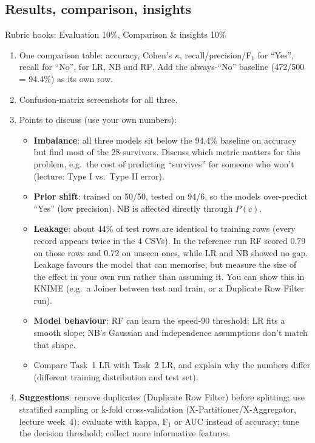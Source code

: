 \documentclass[11pt,a4paper]{article}
\begin{document}
\subsection{Results, comparison, insights}
\begin{rubric}{Rubric hooks: Evaluation 10\%, Comparison \& insights 10\%}
\begin{enumerate}
  \item One comparison table: accuracy, Cohen's $\kappa$, recall/precision/F$_1$ for ``Yes'', recall for
        ``No'', for LR, NB and RF. Add the always-``No'' baseline (472/500 = 94.4\%) as its own row.
  \item Confusion-matrix screenshots for all three.
  \item Points to discuss (use your own numbers):
  \begin{itemize}
    \item \textbf{Imbalance}: all three models sit below the 94.4\% baseline on accuracy but find most
          of the 28 survivors. Discuss which metric matters for this problem, e.g.\ the cost of
          predicting ``survives'' for someone who won't (lecture: Type I vs.\ Type II error).
    \item \textbf{Prior shift}: trained on 50/50, tested on 94/6, so the models over-predict ``Yes''
          (low precision). NB is affected directly through $P(c)$.
    \item \textbf{Leakage}: about 44\% of test rows are identical to training rows (every record appears
          twice in the 4 CSVs). In the reference run RF scored 0.79 on those rows and 0.72 on unseen
          ones, while LR and NB showed no gap. Leakage favours the model that can memorise, but
          measure the size of the effect in your own run rather than assuming it. You can show
          this in KNIME (e.g.\ a Joiner between test and train, or a Duplicate Row Filter run).
    \item \textbf{Model behaviour}: RF can learn the speed-90 threshold; LR fits a smooth slope; NB's
          Gaussian and independence assumptions don't match that shape.
    \item Compare Task~1 LR with Task~2 LR, and explain why the numbers differ (different training
          distribution and test set).
  \end{itemize}
  \item \textbf{Suggestions}: remove duplicates (Duplicate Row Filter) before splitting; use stratified
        sampling or k-fold cross-validation (X-Partitioner/X-Aggregator, lecture week~4); evaluate with
        kappa, F$_1$ or AUC instead of accuracy; tune the decision threshold; collect more informative
        features.
\end{enumerate}
\end{rubric}
\end{document}
